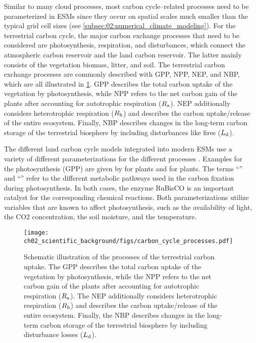 Similar to many cloud processes, most carbon cycle--related processes need to
be parameterized in \acp{ESM} since they occur on spatial scales much smaller
than the typical grid cell sizes (see
\cref{subsec:02:numerical_climate_modeling}). For the terrestrial carbon cycle,
the major carbon exchange processes that need to be considered are
photosynthesis, respiration, and disturbances, which connect the atmospheric
carbon reservoir and the land carbon reservoir. The latter mainly consists of
the vegetation biomass, litter, and soil. The terrestrial carbon exchange
processes are commonly described with \ac{GPP}, \ac{NPP}, \ac{NEP}, and
\ac{NBP}, which are all illustrated in \cref{fig:02:carbon_cycle_processes}.
\Ac{GPP} describes the total carbon uptake of the vegetation by photosynthesis,
while \ac{NPP} refers to the net carbon gain of the plants after accounting for
autotrophic respiration ($R_{\textnormal{a}}{}$). \Ac{NEP} additionally considers
heterotrophic respiration ($R_{\textnormal{h}}{}$) and describes the carbon uptake/release of
the entire ecosystem. Finally, \ac{NBP} describes changes in the long-term
carbon storage of the terrestrial biosphere by including disturbances like
fires ($L_{\textnormal{d}}{}$).

The different land carbon cycle models integrated into modern \acp{ESM} use a
variety of different parameterizations for the different processes
\autocite{Arora2020}. Examples for the photosynthesis (\ac{GPP}) are given by
\textcite{Farquhar1980} for  plants and \textcite{Collatz1992} for
 plants. The terms \enquote{} and \enquote{} refer to the
different metabolic pathways used in the carbon fixation during photosynthesis.
In both cases, the enzyme \ac{RuBisCO} is an important catalyst for the
corresponding chemical reactions. Both parameterizations utilize variables that
are known to affect photosynthesis, such as the availability of light, the
\ac{CO2} concentration, the soil moisture, and the temperature.

\begin{figure}[t]
  \centering
  \texttt{[image: 
    ch02\_scientific\_background/figs/carbon\_cycle\_processes.pdf]}
  \caption[
  Schematic illustration of the processes of the terrestrial carbon uptake.
  ]{
    Schematic illustration of the processes of the terrestrial carbon uptake.
    The \acf{GPP} describes the total carbon uptake of the vegetation by
    photosynthesis, while the \acf{NPP} refers to the net carbon gain of the
    plants after accounting for autotrophic respiration ($R_{\textnormal{a}}{}$). The
    \acf{NEP} additionally considers heterotrophic respiration ($R_{\textnormal{h}}{}$) and
    describes the carbon uptake/release of the entire ecosystem. Finally, the
    \acf{NBP} describes changes in the long-term carbon storage of the
    terrestrial biosphere by including disturbance losses ($L_{\textnormal{d}}{}$).
  }
  \label{fig:02:carbon_cycle_processes}
\end{figure}


